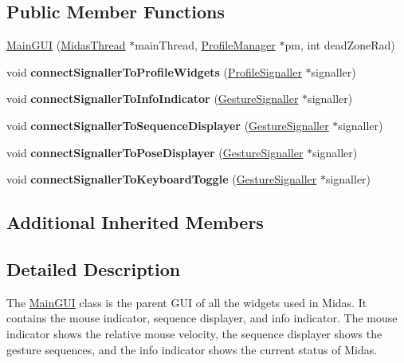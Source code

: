 \subsection*{Public Member Functions}
\begin{DoxyCompactItemize}
\item 
\hyperlink{class_main_g_u_i_a5eb69632ddffc27a14b0eaa03beca8cb}{Main\+G\+U\+I} (\hyperlink{class_midas_thread}{Midas\+Thread} $\ast$main\+Thread, \hyperlink{class_profile_manager}{Profile\+Manager} $\ast$pm, int dead\+Zone\+Rad)
\item 
\hypertarget{class_main_g_u_i_a0b511adc61c2c2c9cfdaa41165ac6087}{void {\bfseries connect\+Signaller\+To\+Profile\+Widgets} (\hyperlink{class_profile_signaller}{Profile\+Signaller} $\ast$signaller)}\label{class_main_g_u_i_a0b511adc61c2c2c9cfdaa41165ac6087}

\item 
\hypertarget{class_main_g_u_i_ada2cc10a2e2ef8b05e3bd01a437730f7}{void {\bfseries connect\+Signaller\+To\+Info\+Indicator} (\hyperlink{class_gesture_signaller}{Gesture\+Signaller} $\ast$signaller)}\label{class_main_g_u_i_ada2cc10a2e2ef8b05e3bd01a437730f7}

\item 
\hypertarget{class_main_g_u_i_a31c4c557a74659225dcb453d1cfb2970}{void {\bfseries connect\+Signaller\+To\+Sequence\+Displayer} (\hyperlink{class_gesture_signaller}{Gesture\+Signaller} $\ast$signaller)}\label{class_main_g_u_i_a31c4c557a74659225dcb453d1cfb2970}

\item 
\hypertarget{class_main_g_u_i_a1335aa0c5aefba52f38a5ab4f6e35e6d}{void {\bfseries connect\+Signaller\+To\+Pose\+Displayer} (\hyperlink{class_gesture_signaller}{Gesture\+Signaller} $\ast$signaller)}\label{class_main_g_u_i_a1335aa0c5aefba52f38a5ab4f6e35e6d}

\item 
\hypertarget{class_main_g_u_i_a06813434f157b4813f82293a1a8a450e}{void {\bfseries connect\+Signaller\+To\+Keyboard\+Toggle} (\hyperlink{class_gesture_signaller}{Gesture\+Signaller} $\ast$signaller)}\label{class_main_g_u_i_a06813434f157b4813f82293a1a8a450e}

\end{DoxyCompactItemize}
\subsection*{Additional Inherited Members}


\subsection{Detailed Description}
The \hyperlink{class_main_g_u_i}{Main\+G\+U\+I} class is the parent G\+U\+I of all the widgets used in Midas. It contains the mouse indicator, sequence displayer, and info indicator. The mouse indicator shows the relative mouse velocity, the sequence displayer shows the gesture sequences, and the info indicator shows the current status of Midas. 

